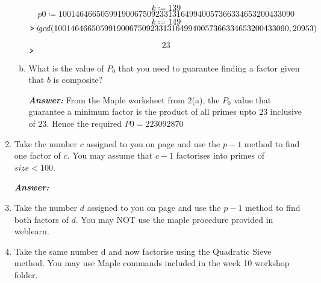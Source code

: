 \documentclass[11pt,a4paper,fleqn]{article}
\begin{document}
\begin{enumerate}[1.]
\begin{enumerate}[(a)]
\begin{flushleft}
\begin{mdframed}
                    \begin{dmath*}
                        k \coloneqq 139
                    \end{dmath*}
                    \vspace{-\bigskipamount}
                    \begin{dmath*}
                        \mathit{p0} \coloneqq 10014646650599190067509233131649940057366334653200433090
                    \end{dmath*}
                    \vspace{-\bigskipamount}
                    \begin{dmath}\label{(3)}
                        k \coloneqq 149
                    \end{dmath}
                    \mapleinput
                    {$ \displaystyle \texttt{>\,} \mathit{igcd} (10014646650599190067509233131649940057366334653200433090,20953) $}

                    \begin{dmath}\label{(4)}
                        23
                    \end{dmath}
                    \mapleinput
                    {$ \displaystyle \texttt{>\,} \, $}
                \end{mdframed}
			\end{flushleft}
			\item What is the value of $P_0$ that you need to guarantee finding a factor given that $b$ is composite?
			\begin{flushleft}
				\textbf{\textit{Answer:}} From the Maple worksheet from 2(a), the $P_0$ value that guarantee a minimum factor is the product of all primes upto $23$ inclusive of $23$. Hence the required $P0 = 223092870$
			\end{flushleft}
		\end{enumerate}
		\item Take the number $c$ assigned to you on page and use the $p-1$ method to find one factor of $c$. You may assume that $c-1$ factorises into primes of $size < 100$.
		\begin{flushleft}
			\textbf{\textit{Answer:}}
		\end{flushleft}
		\item Take the number $d$ assigned to you on page and use the $p-1$ method to find both factors of $d$. You may NOT use the maple procedure provided in weblearn.
		\item Take the same number d and now factorise using the Quadratic Sieve method. You may use Maple commands included in the week 10 workshop folder.


\end{enumerate}
\end{document}
